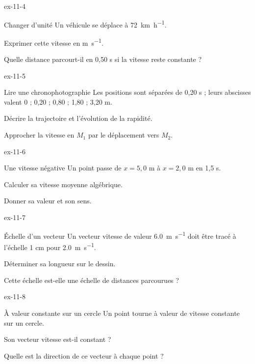 \begin{blocLivre}{ex-11-4}\begin{exercice}[1]{Changer d’unité}
Un véhicule se déplace à \qty{72}{km.h^{-1}}.
\begin{questions}
\item Exprimer cette vitesse en \unit{m.s^{-1}}.
\item Quelle distance parcourt-il en 0,50 s si la vitesse reste constante ?
\end{questions}
\end{exercice}\end{blocLivre}
\begin{blocLivre}{ex-11-5}\begin{exercice}[2]{Lire une chronophotographie}
Les positions sont séparées de 0,20 s ; leurs abscisses valent 0 ; 0,20 ; 0,80 ; 1,80 ; 3,20 m.
\begin{questions}
\item Décrire la trajectoire et l’évolution de la rapidité.
\item Approcher la vitesse en $M_1$ par le déplacement vers $M_2$.
\end{questions}
\end{exercice}\end{blocLivre}
\begin{blocLivre}{ex-11-6}\begin{exercice}[2]{Une vitesse négative}
Un point passe de $x=5,0$ m à $x=2,0$ m en 1,5 s.
\begin{questions}
\item Calculer sa vitesse moyenne algébrique.
\item Donner sa valeur et son sens.
\end{questions}
\end{exercice}\end{blocLivre}
\begin{blocLivre}{ex-11-7}\begin{exercice}[2]{Échelle d’un vecteur}
Un vecteur vitesse de valeur \qty{6,0}{m.s^{-1}} doit être tracé à l’échelle 1 cm pour \qty{2,0}{m.s^{-1}}.
\begin{questions}
\item Déterminer sa longueur sur le dessin.
\item Cette échelle est-elle une échelle de distances parcourues ?
\end{questions}
\end{exercice}\end{blocLivre}
\begin{blocLivre}{ex-11-8}\begin{exercice}[2]{À valeur constante sur un cercle}
Un point tourne à valeur de vitesse constante sur un cercle.
\begin{questions}
\item Son vecteur vitesse est-il constant ?
\item Quelle est la direction de ce vecteur à chaque point ?
\end{questions}
\end{exercice}\end{blocLivre}
